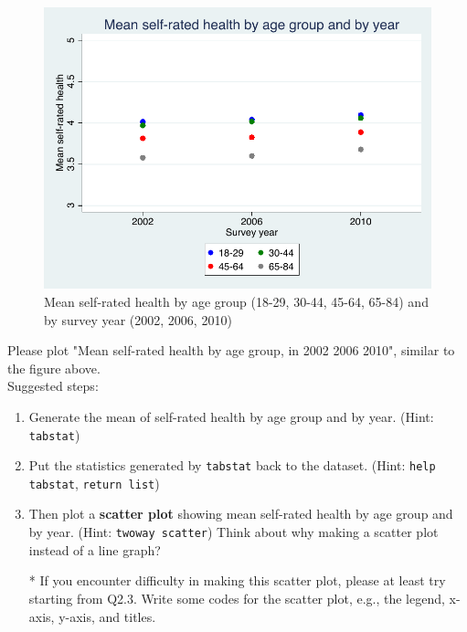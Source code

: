 \documentclass[11pt]{article}
\begin{document}
\begin{figure}[h]
\begin{center}

	\includegraphics[scale=0.45]{images/mean_srh}
	\caption{Mean self-rated health by age group (18-29, 30-44, 45-64, 65-84) and by survey year (2002, 2006, 2010)}
		\end{center}

\end{figure}

\noindent Please plot "Mean self-rated health by age group, in 2002 2006 2010", similar to the figure above. \\
Suggested steps:
\begin{enumerate}
     \item Generate the mean of self-rated health by age group and by year. (Hint: \verb|tabstat|) 
     \item Put the statistics generated by \verb|tabstat| back to the dataset. (Hint: \verb|help tabstat|, \verb|return list|)
     \item Then plot a \textbf{scatter plot} showing mean self-rated health by age group and by year. (Hint: \verb|twoway scatter|) Think about why making a scatter plot instead of a line graph?
     \item[*] If you encounter difficulty in making this scatter plot, please at least try starting from Q2.3. Write some codes for the scatter plot, e.g., the legend, x-axis, y-axis, and titles.
     \end{enumerate}
\end{document}
